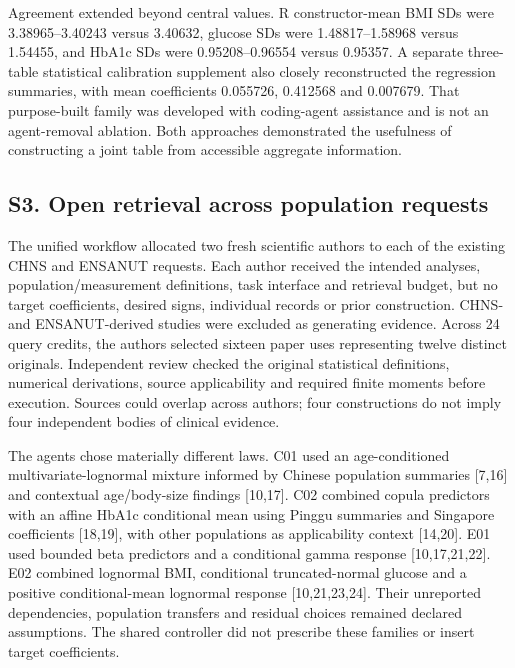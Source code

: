 \documentclass[11pt,letterpaper]{article}
\begin{document}
\endgroup

Agreement extended beyond central values. R constructor-mean BMI SDs were 3.38965–\allowbreak{}3.40243 versus 3.40632, glucose SDs were 1.48817–\allowbreak{}1.58968 versus 1.54455, and HbA1c SDs were 0.95208–\allowbreak{}0.96554 versus 0.95357. A separate three-table statistical calibration supplement also closely reconstructed the regression summaries, with mean coefficients 0.055726, 0.412568 and 0.007679. That purpose-built family was developed with coding-agent assistance and is not an agent-removal ablation. Both approaches demonstrated the usefulness of constructing a joint table from accessible aggregate information.


\subsection*{S3. Open retrieval across population requests}

The unified workflow allocated two fresh scientific authors to each of the existing CHNS and ENSANUT requests. Each author received the intended analyses, population/\allowbreak{}measurement definitions, task interface and retrieval budget, but no target coefficients, desired signs, individual records or prior construction. CHNS- and ENSANUT-derived studies were excluded as generating evidence. Across 24 query credits, the authors selected sixteen paper uses representing twelve distinct originals. Independent review checked the original statistical definitions, numerical derivations, source applicability and required finite moments before execution. Sources could overlap across authors; four constructions do not imply four independent bodies of clinical evidence.


The agents chose materially different laws. C01 used an age-conditioned multivariate-lognormal mixture informed by Chinese population summaries [7,16] and contextual age/\allowbreak{}body-size findings [10,17]. C02 combined copula predictors with an affine HbA1c conditional mean using Pinggu summaries and Singapore coefficients [18,19], with other populations as applicability context [14,20]. E01 used bounded beta predictors and a conditional gamma response [10,17,21,22]. E02 combined lognormal BMI, conditional truncated-normal glucose and a positive conditional-mean lognormal response [10,21,23,24]. Their unreported dependencies, population transfers and residual choices remained declared assumptions. The shared controller did not prescribe these families or insert target coefficients.
\end{document}
